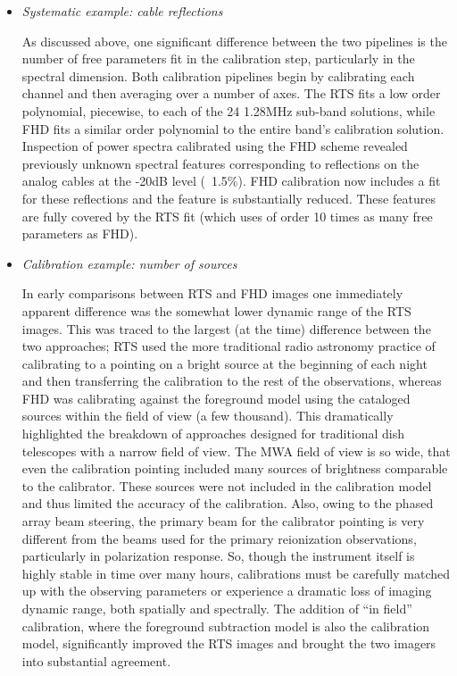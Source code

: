 \documentclass[twolcolumn,iop]{emulateapj}
\begin{document}
\begin{itemize}

\item \emph{ Systematic example: cable reflections}

As discussed above, one significant difference between the two pipelines is the number of free parameters fit in the calibration step, particularly in the spectral dimension.  Both calibration pipelines begin by calibrating each channel and then averaging over a number of axes.  The RTS fits a low order polynomial, piecewise, to each of the 24 1.28MHz sub-band solutions, while FHD fits a similar order polynomial to the entire  band's calibration solution.  Inspection of power spectra calibrated using the FHD scheme revealed previously unknown spectral features corresponding to reflections on the analog cables at the -20dB level (~1.5\%). FHD calibration now includes a fit for these reflections and the feature is substantially reduced. These features are fully covered by the RTS fit (which uses of order 10 times as many free parameters as FHD). 

\item \emph{Calibration example: number of sources}

In early comparisons between RTS and FHD images one immediately apparent difference was the somewhat lower dynamic range of the RTS images.  This was traced to the largest (at the time) difference between the two approaches; RTS used the more traditional radio astronomy practice of calibrating to a pointing on a bright source at the beginning of each night and then transferring the calibration to the rest of the observations, whereas FHD was calibrating against the foreground model using the cataloged sources within the field of view (a few thousand). This dramatically highlighted the breakdown of approaches designed for traditional dish telescopes with a narrow field of view.  The MWA field of view is so wide, that even the calibration pointing included many sources of brightness comparable to the calibrator. These sources were not included in the calibration model and thus limited the accuracy of the calibration. Also, owing to the phased array beam steering, the primary beam for the calibrator pointing is very different from the beams used for the primary reionization observations, particularly in polarization response.  So, though the instrument itself is highly stable in time over many hours, calibrations must be carefully matched up with the observing parameters or experience a dramatic loss of imaging dynamic range, both spatially and spectrally. The addition of ``in field'' calibration, where the foreground subtraction model is also the calibration model, significantly improved the RTS images and brought the two imagers into substantial agreement. 



\end{itemize}
\end{document}
